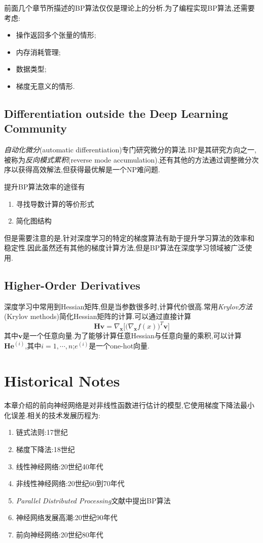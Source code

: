 前面几个章节所描述的BP算法仅仅是理论上的分析.为了编程实现BP算法,还需要考虑:
\begin{itemize}
    \item 操作返回多个张量的情形;
    \item 内存消耗管理;
    \item 数据类型;
    \item 梯度无意义的情形.
\end{itemize}

\subsection{Differentiation outside the Deep Learning Community}

\textit{自动化微分}(automatic differentiation)专门研究微分的算法.BP是其研究方向之一,被称为\textit{反向模式累积}(reverse mode accumulation).还有其他的方法通过调整微分次序以获得高效解法,但获得最优解是一个NP难问题.

提升BP算法效率的途径有
\begin{enumerate}
    \item 寻找导数计算的等价形式
    \item 简化图结构
\end{enumerate}

但是需要注意的是,针对深度学习的特定的梯度算法有助于提升学习算法的效率和稳定性.因此虽然还有其他的梯度计算方法,但是BP算法在深度学习领域被广泛使用.

\subsection{Higher-Order Derivatives}

深度学习中常用到Hessian矩阵,但是当参数很多时,计算代价很高.常用\textit{Krylov方法}(Krylov methods)简化Hessian矩阵的计算.可以通过直接计算
\begin{equation}
\mathbf{Hv}=\nabla_{\mathbf x}\Big[\big(\nabla_{\mathbf x}f(x)\big)^T\mathbf v\Big]
\end{equation}
其中$\mathbf v$是一个任意向量.为了能够计算任意Hessian与任意向量的乘积,可以计算$\mathbf{He}^{(i)}$,其中$i=1,\cdots,n$;$e^{(i)}$是一个one-hot向量.

\section{Historical Notes}

本章介绍的前向神经网络是对非线性函数进行估计的模型,它使用梯度下降法最小化误差.相关的技术发展历程为:
\begin{enumerate}
    \item 链式法则:17世纪
    \item 梯度下降法:18世纪
    \item 线性神经网络:20世纪40年代
    \item 非线性神经网络:20世纪60到70年代
    \item \textit{Parallel Distributed Processing}文献中提出BP算法
    \item 神经网络发展高潮:20世纪90年代
    \item 前向神经网络:20世纪80年代
\end{enumerate}

